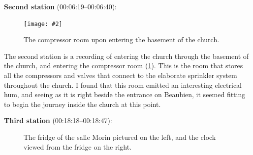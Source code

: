 \documentclass[12pt,twoside,maitrise]{dms_ks}
\newcommand{\customincludegraphics}[4][]{%
    \begin{figure}[H]
        \centering
        \texttt{[image: \#2]}
        \caption{#4}
	\label{#3} 
    \end{figure}
}
\theoremstyle{definition}
\begin{document}
{{%

\textbf{Second station} (00:06:19--00:06:40):

\customincludegraphics[scale=0.25]{DSC00149_1.JPG}{fig:station2}{The compressor room upon entering the basement of the church.}%

The second station is a recording of entering the church through the basement of the church, and entering the compressor room (\cref{fig:station2}). 
This is the room that stores all the compressors and valves that connect to the elaborate sprinkler system throughout the church. 
I found that this room emitted an interesting electrical hum, and seeing as it is right beside the entrance on Beaubien, it seemed fitting to begin the journey inside the church at this point.

\textbf{Third station} (00:18:18--00:18:47):

\begin{figure}[h]
    \centering
    \caption{The fridge of the salle Morin pictured on the left, and the clock viewed from the fridge on the right.}
    \label{fig:station3}
\end{figure}

}}
\end{document}
